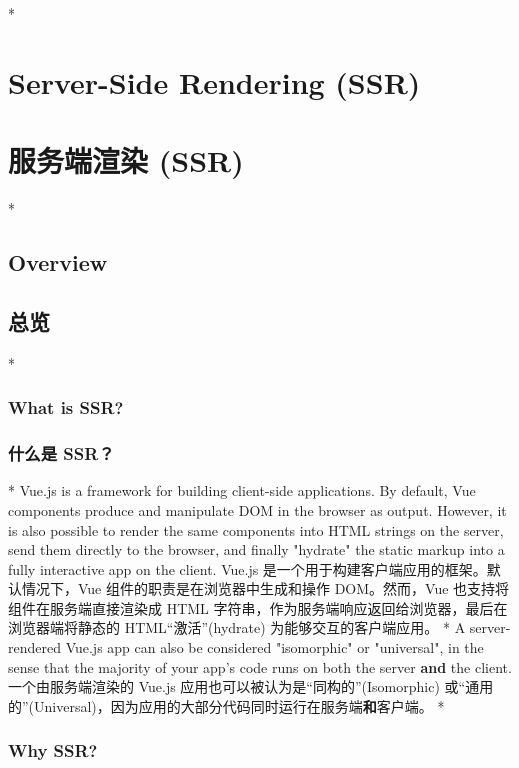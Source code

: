 \begin{paracol}{2}
 
\switchcolumn[0]*%
\section{Server-Side Rendering (SSR)}
\switchcolumn
\section{服务端渲染 (SSR)}
\switchcolumn[0]*%
\subsection{Overview}
\switchcolumn
\subsection{总览}
\switchcolumn[0]*%
\subsubsection{What is SSR?}
\switchcolumn
\subsubsection{什么是 SSR？}
\switchcolumn[0]*%
Vue.js is a framework for building client-side applications. By default,
Vue components produce and manipulate DOM in the browser as output.
However, it is also possible to render the same components into HTML
strings on the server, send them directly to the browser, and finally
"hydrate" the static markup into a fully interactive app on the client.
\switchcolumn
Vue.js 是一个用于构建客户端应用的框架。默认情况下，Vue
组件的职责是在浏览器中生成和操作 DOM。然而，Vue
也支持将组件在服务端直接渲染成 HTML
字符串，作为服务端响应返回给浏览器，最后在浏览器端将静态的
HTML``激活''(hydrate) 为能够交互的客户端应用。
\switchcolumn[0]*%
A server-rendered Vue.js app can also be considered "isomorphic" or
"universal", in the sense that the majority of your app's code runs on
both the server \textbf{and} the client.
\switchcolumn
一个由服务端渲染的 Vue.js 应用也可以被认为是``同构的''(Isomorphic)
或``通用的''(Universal)，因为应用的大部分代码同时运行在服务端\textbf{和}客户端。
\switchcolumn[0]*%
\subsubsection{Why SSR?}
\switchcolumn

\end{paracol}
